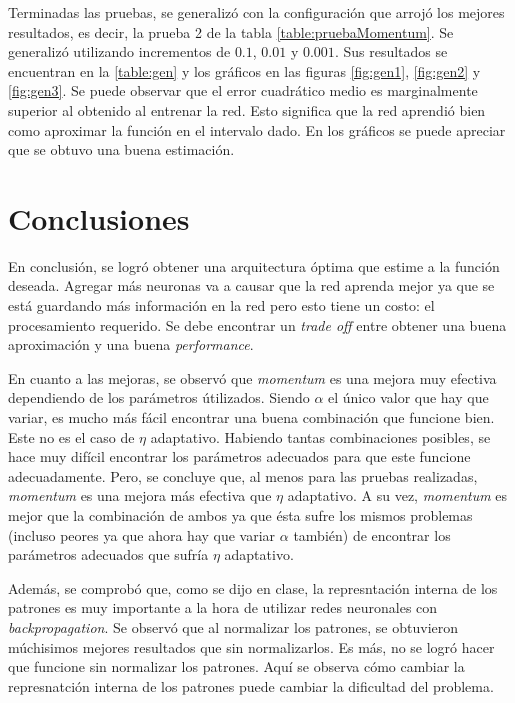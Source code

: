 \documentclass[11pt,a4paper]{article}
\begin{document}
Terminadas las pruebas, se generalizó con la configuración que arrojó los mejores resultados, es decir, la prueba 2 de la tabla \ref{table:pruebaMomentum}. Se generalizó utilizando incrementos de $0.1$, $0.01$ y $0.001$. Sus resultados se encuentran en la \ref{table:gen} y los gráficos en las figuras \ref{fig:gen1}, \ref{fig:gen2} y \ref{fig:gen3}. Se puede observar que el error cuadrático medio es marginalmente superior al obtenido al entrenar la red. Esto significa que la red aprendió bien como aproximar la función en el intervalo dado. En los gráficos se puede apreciar que se obtuvo una buena estimación. 

\section{Conclusiones}

En conclusión, se logró obtener una arquitectura óptima que estime a la función deseada. Agregar más neuronas va a causar que la red aprenda mejor ya que se está guardando más información en la red pero esto tiene un costo: el procesamiento requerido. Se debe encontrar un \emph{trade off} entre obtener una buena aproximación y una buena \emph{performance}.

En cuanto a las mejoras, se observó que \emph{momentum} es una mejora muy efectiva dependiendo de los parámetros útilizados. Siendo $\alpha$ el único valor que hay que variar, es mucho más fácil encontrar una buena combinación que funcione bien. Este no es el caso de $\eta$ adaptativo. Habiendo tantas combinaciones posibles, se hace muy difícil encontrar los parámetros adecuados para que este funcione adecuadamente. Pero, se concluye que, al menos para las pruebas realizadas, \emph{momentum} es una mejora más efectiva que $\eta$ adaptativo. A su vez, \emph{momentum} es mejor que la combinación de ambos ya que ésta sufre los mismos problemas (incluso peores ya que ahora hay que variar $\alpha$ también) de encontrar los parámetros adecuados que sufría $\eta$ adaptativo.

Además, se comprobó que, como se dijo en clase, la represntación interna de los patrones es muy importante a la hora de utilizar redes neuronales con \emph{backpropagation}. Se observó que al normalizar los patrones, se obtuvieron múchisimos mejores resultados que sin normalizarlos. Es más, no se logró hacer que funcione sin normalizar los patrones. Aquí se observa cómo cambiar la represnatción interna de los patrones puede cambiar la dificultad del problema.
\end{document}
